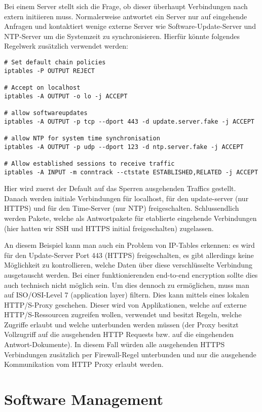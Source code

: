 Bei einem Server stellt sich die Frage, ob dieser überhaupt Verbindungen nach extern initiieren muss. Normalerweise antwortet ein Server nur auf eingehende Anfragen und kontaktiert wenige externe Server wie Software-Update-Server und NTP-Server um die Systemzeit zu synchronisieren. Hierfür könnte folgendes Regelwerk zusätzlich verwendet werden:

\begin{verbatim}
# Set default chain policies
iptables -P OUTPUT REJECT

# Accept on localhost
iptables -A OUTPUT -o lo -j ACCEPT

# allow softwareupdates
iptables -A OUTPUT -p tcp --dport 443 -d update.server.fake -j ACCEPT

# allow NTP for system time synchronisation
iptables -A OUTPUT -p udp --dport 123 -d ntp.server.fake -j ACCEPT

# Allow established sessions to receive traffic
iptables -A INPUT -m conntrack --ctstate ESTABLISHED,RELATED -j ACCEPT
\end{verbatim}

Hier wird zuerst der Default auf das Sperren ausgehenden Traffics gestellt. Danach werden initiale Verbindungen für localhost, für den update-server (nur HTTPS) und für den Time-Server (nur NTP) freigeschalten. Schlussendlich werden Pakete, welche als Antwortpakete für etablierte eingehende Verbindungen (hier hatten wir SSH und HTTPS initial freigeschalten) zugelassen.

An diesem Beispiel kann man auch ein Problem von IP-Tables erkennen: es wird für den Update-Server Port 443 (HTTPS) freigeschalten, es gibt allerdings keine Möglichkeit zu kontrollieren, welche Daten über diese verschlüsselte Verbindung ausgetauscht werden. Bei einer funktionierenden end-to-end encryption sollte dies auch technisch nicht möglich sein. Um dies dennoch zu ermöglichen, muss man auf ISO/OSI-Level 7 (application layer) filtern. Dies kann mittels eines lokalen HTTP/S-Proxy geschehen. Dieser wird von Applikationen, welche auf externe HTTP/S-Ressourcen zugreifen wollen, verwendet und besitzt Regeln, welche Zugriffe erlaubt und welche unterbunden werden müssen (der Proxy besitzt Vollzugriff auf die ausgehenden HTTP Requests bzw. auf die eingehenden Antwort-Dokumente). In diesem Fall würden alle ausgehenden HTTPS Verbindungen zusätzlich per Firewall-Regel unterbunden und nur die ausgehende Kommunikation vom HTTP Proxy erlaubt werden.

\chapter{Software Management}

